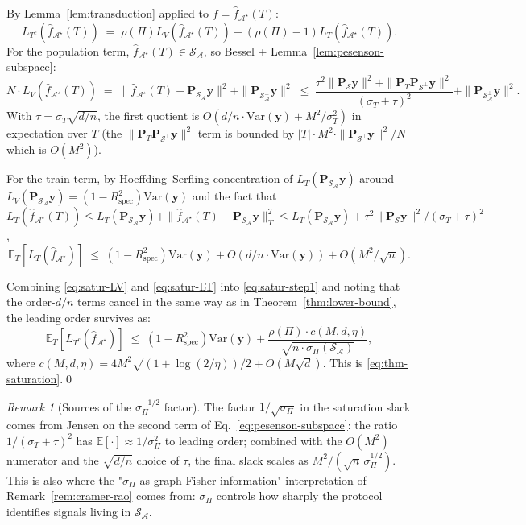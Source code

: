 \documentclass[11pt,a4paper]{article}
\theoremstyle{plain}
\theoremstyle{definition}
\theoremstyle{remark}
\newtheorem{remark}[theorem]{Remark}
\newcommand{\by}{\mathbf{y}}
\newcommand{\bP}{\mathbf{P}}
\newcommand{\E}{\mathbb{E}}
\newcommand{\Var}{\mathrm{Var}}
\newcommand{\Rspec}{R^2_{\mathrm{spec}}}
\newcommand{\Scal}{\mathcal{S}}
\newcommand{\Acal}{\mathcal{A}}
\begin{document}
By Lemma~\ref{lem:transduction} applied to $f = \hat f_{\Acal^\star}(T)$:
\begin{equation}
    L_{T^c}(\hat f_{\Acal^\star}(T))
    \;=\; \rho(\Pi) L_V(\hat f_{\Acal^\star}(T)) - (\rho(\Pi) - 1) L_T(\hat f_{\Acal^\star}(T)).
    \label{eq:satur-step1}
\end{equation}
For the population term, $\hat f_{\Acal^\star}(T) \in \Scal_\Acal$, so
Bessel + Lemma~\ref{lem:pesenson-subspace}:
\begin{equation}
    N \cdot L_V(\hat f_{\Acal^\star}(T))
    \;=\; \|\hat f_{\Acal^\star}(T) - \bP_{\Scal_\Acal}\by\|^2 + \|\bP_{\Scal_\Acal^\perp}\by\|^2
    \;\leq\; \frac{\tau^2 \|\bP_\Scal\by\|^2 + \|\bP_T\bP_{\Scal^\perp}\by\|^2}{(\sigma_T + \tau)^2}
        + \|\bP_{\Scal_\Acal^\perp}\by\|^2.
    \label{eq:satur-LV}
\end{equation}
With $\tau = \sigma_T \sqrt{d/n}$, the first quotient is
$O(d/n \cdot \Var(\by) + M^2/\sigma_T^2)$ in expectation over $T$
(the $\|\bP_T\bP_{\Scal^\perp}\by\|^2$ term is bounded by
$|T| \cdot M^2 \cdot \|\bP_{\Scal^\perp}\by\|^2/N$ which is $O(M^2)$).

For the train term, by Hoeffding--Serfling concentration of
$L_T(\bP_{\Scal_\Acal}\by)$ around $L_V(\bP_{\Scal_\Acal}\by) = (1-\Rspec)\Var(\by)$
and the fact that $L_T(\hat f_{\Acal^\star}(T)) \leq L_T(\bP_{\Scal_\Acal}\by)
+ \|\hat f_{\Acal^\star}(T) - \bP_{\Scal_\Acal}\by\|_T^2 \leq
L_T(\bP_{\Scal_\Acal}\by) + \tau^2 \|\bP_\Scal\by\|^2/(\sigma_T + \tau)^2$,
\begin{equation}
    \E_T[L_T(\hat f_{\Acal^\star})]
    \;\leq\; (1-\Rspec)\Var(\by) + O(d/n \cdot \Var(\by)) + O(M^2/\sqrt{n}).
    \label{eq:satur-LT}
\end{equation}

Combining \eqref{eq:satur-LV} and \eqref{eq:satur-LT} into
\eqref{eq:satur-step1} and noting that the order-$d/n$ terms cancel
in the same way as in Theorem~\ref{thm:lower-bound}, the leading
order survives as:
\begin{equation}
    \E_T[L_{T^c}(\hat f_{\Acal^\star})]
    \;\leq\; (1-\Rspec)\Var(\by)
        + \frac{\rho(\Pi) \cdot c(M, d, \eta)}{\sqrt{n \cdot \sigma_\Pi(\Scal_\Acal)}},
    \label{eq:satur-final}
\end{equation}
where $c(M, d, \eta) = 4 M^2 \sqrt{(1+\log(2/\eta))/2} + O(M\sqrt{d})$.
This is \eqref{eq:thm-saturation}.\qed

\begin{remark}[Sources of the $\sigma_\Pi^{-1/2}$ factor]
\label{rem:sigma-factor}
The factor $1/\sqrt{\sigma_\Pi}$ in the saturation slack comes from
Jensen on the second term of Eq.~\eqref{eq:pesenson-subspace}:
the ratio $1/(\sigma_T + \tau)^2$ has $\E[\cdot] \approx 1/\sigma_\Pi^2$
to leading order; combined with the $O(M^2)$ numerator and the
$\sqrt{d/n}$ choice of $\tau$, the final slack scales as
$M^2/(\sqrt{n}\,\sigma_\Pi^{1/2})$.  This is also where the "$\sigma_\Pi$
as graph-Fisher information" interpretation of
Remark~\ref{rem:cramer-rao} comes from: $\sigma_\Pi$ controls how
sharply the protocol identifies signals living in $\Scal_\Acal$.
\end{remark}
\end{document}
